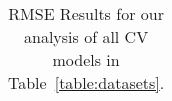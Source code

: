 \begin{table}[t]
\begin{center}
\begin{tabular}{|c|c|c|c|c|c|}
\hline
\end{tabular}
\vspace{-5mm}
\end{center}
\caption{RMSE Results for our analysis of all CV models in Table~\ref{table:datasets}. }
\label{table:RMSEresults}
\end{table}


